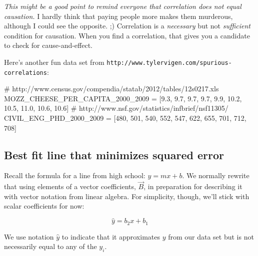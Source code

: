 \documentclass[titlepage]{tufte-book}
\begin{document}
\begin{fullwidth}
{\em This might be a good point to remind everyone that correlation does not equal causation.}  I hardly think that paying people more makes them murderous, although I could see the opposite. ;)  Correlation is a {\em necessary} but not {\em sufficient} condition for causation. When you find a correlation, that gives you a candidate to check for cause-and-effect.

Here's another fun data set from {\tt\small http://www.tylervigen.com/spurious-correlations}:

\begin{pyverbatim}
# http://www.census.gov/compendia/statab/2012/tables/12s0217.xls
MOZZ_CHEESE_PER_CAPITA_2000_2009 = [9.3, 9.7, 9.7, 9.7, 9.9, 10.2, 10.5, 11.0, 10.6, 10.6]
# http://www.nsf.gov/statistics/infbrief/nsf11305/
CIVIL_ENG_PHD_2000_2009          = [480, 501, 540, 552, 547, 622, 655, 701, 712, 708]
\end{pyverbatim}

\begin{center}
\end{center}

\subsection{Best fit line that minimizes squared error}

Recall the formula for a line from high school: $y = m x + b$.  We normally rewrite that using elements of a vector coefficients, $\vec{B}$, in preparation for describing it with vector notation from linear algebra. For simplicity,  though, we'll stick with scalar coefficients for now:

\[
\hat{y} = b_2 x + b_1
\]

\noindent We use notation $\hat{y}$ to indicate that it approximates $y$ from our data set but is not necessarily equal to any of the $y_i$.


\end{fullwidth}
\end{document}
